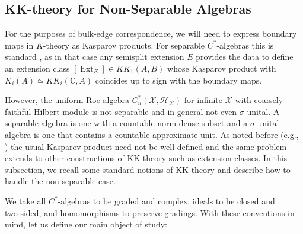 \documentclass[12pt]{amsart}
\newcommand{\CM}{{\mathbb C}}
\newcommand{\Hh}{{\mathcal H}}
\newcommand{\Xx}{{\mathcal X}}
\DeclareMathOperator*{\Ext}{Ext}
\begin{document}
\subsection{KK-theory for Non-Separable Algebras}
For the purposes of bulk-edge correspondence, we will need to  express boundary maps in $K$-theory as Kasparov products. For separable $C^*$-algebras this is standard \cite[Section 3]{jensen2012elements}, as in that case any semisplit extension $E$ provides the data to define an extension class $[\Ext_E]\in KK_1(A, B)$ whose Kasparov product with $K_i(A)\simeq KK_i(\CM, A)$ coincides up to sign with the boundary maps. 

However, the uniform Roe algebra $C^*_u(\Xx, \Hh_\Xx)$ for infinite $\Xx$ with coarsely faithful Hilbert module is not separable and in general not even $\sigma$-unital.
A separable algebra is one with a countable norm-dense subset and a $\sigma$‑unital algebra is one that contains a countable approximate unit.
As noted before (e.g., \cite[Remark 1.5]{SpakulaWillett2013}) the usual Kasparov product need not be well-defined and the same problem extends to other constructions of KK-theory such as extension classes. In this subsection, we recall some standard notions of KK-theory and describe how to handle the non-separable case.

We take all $C^*$‑algebras to be graded and complex, ideals to be closed and two‑sided, and homomorphisms to preserve gradings.
With these conventions in mind, let us define our main object of study:
\end{document}
